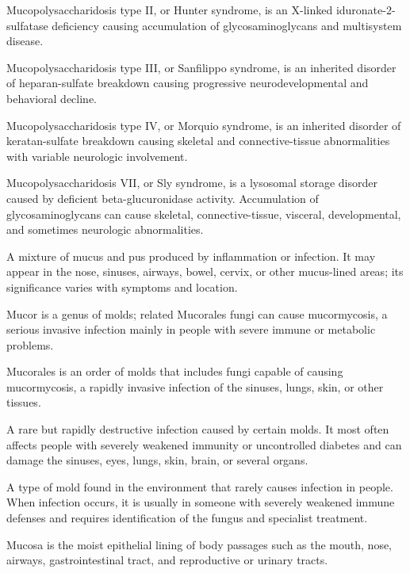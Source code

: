  Mucopolysaccharidosis type II, or Hunter syndrome, is an X-linked iduronate-2-sulfatase deficiency causing accumulation of glycosaminoglycans and multisystem disease.

 Mucopolysaccharidosis type III, or Sanfilippo syndrome, is an inherited disorder of heparan-sulfate breakdown causing progressive neurodevelopmental and behavioral decline.

 Mucopolysaccharidosis type IV, or Morquio syndrome, is an inherited disorder of keratan-sulfate breakdown causing skeletal and connective-tissue abnormalities with variable neurologic involvement.

 Mucopolysaccharidosis VII, or Sly syndrome, is a lysosomal storage disorder caused by deficient beta-glucuronidase activity. Accumulation of glycosaminoglycans can cause skeletal, connective-tissue, visceral, developmental, and sometimes neurologic abnormalities.

 A mixture of mucus and pus produced by inflammation or infection. It may appear in the nose, sinuses, airways, bowel, cervix, or other mucus-lined areas; its significance varies with symptoms and location.

 Mucor is a genus of molds; related Mucorales fungi can cause mucormycosis, a serious invasive infection mainly in people with severe immune or metabolic problems.

 Mucorales is an order of molds that includes fungi capable of causing mucormycosis, a rapidly invasive infection of the sinuses, lungs, skin, or other tissues.

 A rare but rapidly destructive infection caused by certain molds. It most often affects people with severely weakened immunity or uncontrolled diabetes and can damage the sinuses, eyes, lungs, skin, brain, or several organs.

 A type of mold found in the environment that rarely causes infection in people. When infection occurs, it is usually in someone with severely weakened immune defenses and requires identification of the fungus and specialist treatment.

 Mucosa is the moist epithelial lining of body passages such as the mouth, nose, airways, gastrointestinal tract, and reproductive or urinary tracts.

